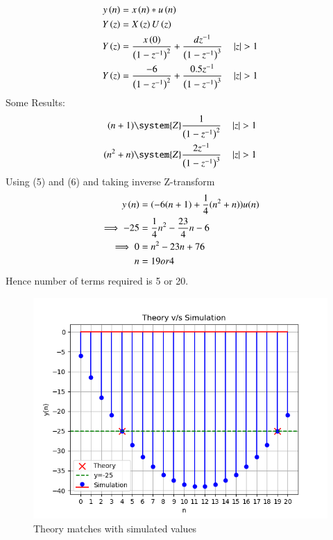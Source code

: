 \documentclass[journal,12pt,twocolumn]{IEEEtran}
\theoremstyle{remark}
\begin{document}
\begin{align} 
    y\left(n\right) &= x\left(n\right) * u\left(n\right)\\
    Y\left(z\right) &= X\left(z\right) U \left(z\right)\\
    Y\left(z\right) &= \frac{x\left(0\right)}{\left(1-z^{-1}\right)^2} + \frac{dz^{-1}}{\left(1-z^{-1}\right)^3}\quad\left\vert z\right\vert>{1}\\
    Y\left(z\right) &= \frac{-6}{\left(1-z^{-1}\right)^2} + \frac{0.5z^{-1}}{\left(1-z^{-1}\right)^3}\quad\left\vert z\right\vert>{1}
\end{align}
 Some Results:
\begin{align}
  (n+1)\system{Z} \frac{1}{\brak{1-z^{-1}}^2}\quad\abs{z}>{1}\\ 
  (n^2+n)\system{Z}\frac{2z^{-1}}{\brak{1-z^{-1}}^3}\quad\abs{z}>{1}
\end{align}
Using (5) and (6) and taking inverse Z-transform
\begin{align}
  y\left(n\right) &= (-6(n+1)+\frac{1}{4}(n^2+n))u(n)\\
  \implies -25 &= \frac{1}{4}n^2-\frac{23}{4}n-6\\
 \implies 0 &=n^{2}-23n+76\\
    n &= 19 or 4
\end{align}
Hence number of terms required is 5 or 20.
\begin{figure}[!ht]
    \centering
    \includegraphics[width=1\linewidth]{figs/plot.png}
    \caption{Theory matches with simulated values}
    \label{fig:enter-label}
\end{figure}
\end{document}
